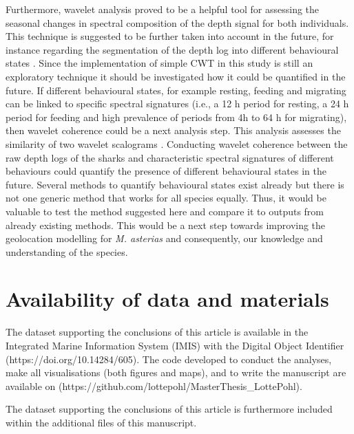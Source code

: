 \documentclass[
  authoryear,
  review,
  3p]{elsarticle}
\begin{document}
Furthermore, wavelet analysis proved to be a helpful tool for assessing
the seasonal changes in spectral composition of the depth signal for
both individuals. This technique is suggested to be further taken into
account in the future, for instance regarding the segmentation of the
depth log into different behavioural states \citep[as already shown
by][]{soleymani_2017}. Since the implementation of simple CWT in this
study is still an exploratory technique it should be investigated how it
could be quantified in the future. If different behavioural states, for
example resting, feeding and migrating can be linked to specific
spectral signatures (i.e., a 12 h period for resting, a 24 h period for
feeding and high prevalence of periods from 4h to 64 h for migrating),
then wavelet coherence could be a next analysis step. This analysis
assesses the similarity of two wavelet scalograms \citep{grinsted_2004}.
Conducting wavelet coherence between the raw depth logs of the sharks
and characteristic spectral signatures of different behaviours could
quantify the presence of different behavioural states in the future.
Several methods to quantify behavioural states exist already
\citep{pedersen_2008, heerah_2017} but there is not one generic method
that works for all species equally. Thus, it would be valuable to test
the method suggested here and compare it to outputs from already
existing methods. This would be a next step towards improving the
geolocation modelling for \emph{M. asterias} and consequently, our
knowledge and understanding of the species.

\hypertarget{availability-of-data-and-materials}{%
\section*{Availability of data and
materials}\label{availability-of-data-and-materials}}

The dataset supporting the conclusions of this article is available in
the Integrated Marine Information System (IMIS) with the Digital Object
Identifier (https://doi.org/10.14284/605). The code developed to conduct
the analyses, make all visualisations (both figures and maps), and to
write the manuscript are available on
(https://github.com/lottepohl/MasterThesis\_LottePohl).

The dataset supporting the conclusions of this article is furthermore
included within the additional files of this manuscript.
\end{document}
